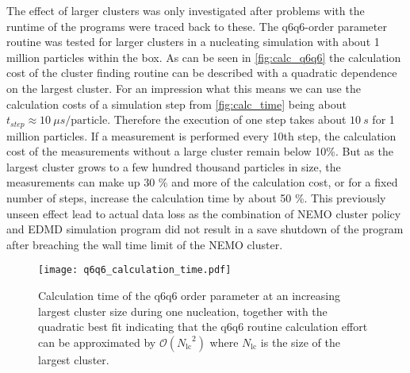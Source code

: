 
The effect of larger clusters was only investigated after problems with the runtime of the programs were traced back to these. The q6q6-order parameter routine was tested for larger clusters in a nucleating simulation with about 1 million particles within the box. As can be seen in \autoref{fig:calc_q6q6} the calculation cost of the cluster finding routine can be described with a quadratic dependence on the largest cluster. For an impression what this means we can use the calculation costs of a simulation step from \autoref{fig:calc_time} being about $t_{step} \approx \SI{10}{\mu s \per \text{particle} }$. Therefore the execution of one step takes about $\SI{10}{s}$ for 1 million particles. If a measurement is performed every 10th step, the calculation cost of the measurements without a large cluster remain below 10\%. But as the largest cluster grows to a few hundred thousand particles in size, the measurements can make up 30 \% and more of the calculation cost, or for a fixed number of steps, increase the calculation time by about 50 \%. This previously unseen effect lead to actual data loss as the combination of NEMO cluster policy and EDMD simulation program did not result in a save shutdown of the program after breaching the wall time limit of the NEMO cluster.\\

\begin{figure}[h!]
\centering
\texttt{[image: q6q6\_calculation\_time.pdf]}
\caption[Quadratic calculation time of q6q6-order parameter cluster finding routine]{Calculation time of the q6q6 order parameter at an increasing largest cluster size during one nucleation, together with the quadratic best fit indicating that the q6q6 routine calculation effort can be approximated by $\mathcal{O}({N_{\text{lc}}}^2)$ where $N_{\text{lc}}$ is the size of the largest cluster.}
\label{fig:calc_q6q6}
\end{figure}


